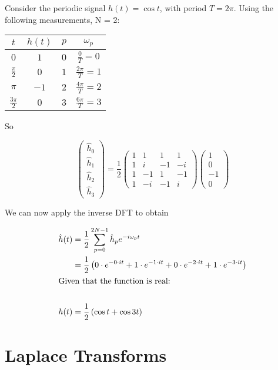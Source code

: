 \documentclass{physics_notes}
\begin{document}
\begin{example}{}
Consider the periodic signal $h(t) = \cos{t}$, with period $T = 2\pi$. Using the following measurements, N = 2:


\begin{tabular}{c || c | c | c}
$t$ & $h(t)$ & $p$ & $\omega_p$ \\
\hline
$0$ & $1$ & $0$ & $\frac{0}{T} = 0$ \\
$\frac{\pi}{2}$ & $0$ & $1$ & $\frac{2\pi}{T} = 1$ \\
$\pi$ & $-1$ & $2$ & $\frac{4\pi}{T} = 2$ \\
$\frac{3\pi}{2}$ & $0$ & $3$ & $\frac{6\pi}{T} = 3$
\end{tabular}

So

\begin{equation*}
\begin{pmatrix} \hat{h}_0 \\ \hat{h}_1 \\ \hat{h}_2 \\ \hat{h}_3 \end{pmatrix} = \frac{1}{2}\begin{pmatrix} 1 & 1 & 1 & 1 \\ 1 & i & -1 & -i \\ 1 & -1 & 1 & -1 \\ 1 & -i & -1 & i\end{pmatrix}\begin{pmatrix} 1 \\ 0 \\ -1 \\ 0\end{pmatrix}
\end{equation*}

We can now apply the inverse DFT to obtain

\begin{align*}
\hat{h}(t) &= \frac{1}{2}\sum_{p=0}^{2N-1} \hat{h}_p e^{-i\omega_p t} \\
&= \frac{1}{2}\left( 0\cdot e^{-0\cdot it} + 1\cdot e^{-1\cdot it} + 0\cdot e^{-2\cdot it} + 1\cdot e^{-3\cdot it}\right) \\
\intertext{Given that the function is real:} \\
h(t) &= \frac{1}{2}\left(\cos{t} + \cos{3t}\right)
\end{align*}
\end{example}

\section{Laplace Transforms} 
\end{document}
